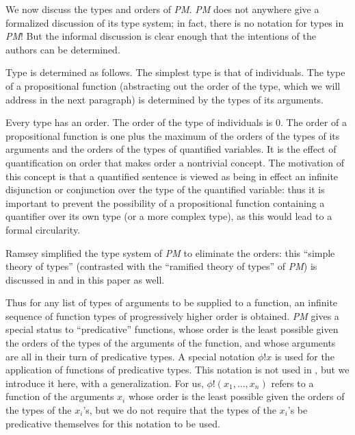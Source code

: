 \documentclass{article}
\begin{document}
We now discuss the types and orders of {\em PM\/}.  {\em PM\/} does
not anywhere give a formalized discussion of its type system; in fact,
there is no notation for types in {\em PM\/}!  But the informal
discussion is clear enough that the intentions of the authors can be
determined.

Type is determined as follows.  The simplest type is that of
individuals.  The type of a propositional function (abstracting out
the order of the type, which we will address in the next paragraph) is
determined by the types of its arguments.

Every type has an order.  The order of the type of individuals is 0.
The order of a propositional function is one plus the maximum of the
orders of the types of its arguments and the orders of the types of
quantified variables.  It is the effect of quantification on order
that makes order a nontrivial concept.  The motivation of this concept
is that a quantified sentence is viewed as being in effect an infinite
disjunction or conjunction over the type of the quantified variable:
thus it is important to prevent the possibility of a propositional
function containing a quantifier over its own type (or a more complex
type), as this would lead to a formal circularity.

Ramsey simplified the type system of {\em PM\/} to eliminate the
orders: this ``simple theory of types'' (contrasted with the
``ramified theory of types'' of {\em PM\/}) is discussed in
\cite{types40} and in this paper as well.

Thus for any list of types of arguments to be supplied to a function,
an infinite sequence of function types of progressively higher order
is obtained.  {\em PM\/} gives a special status to ``predicative''
functions, whose order is the least possible given the orders of the
types of the arguments of the function, and whose arguments are all in
their turn of predicative types.  A special notation $\phi! x$ is used
for the application of functions of predicative types.  This notation
is not used in \cite{types40}, but we introduce it here, with a
generalization.  For us, $\phi!(x_1,\ldots,x_n)$ refers to a function
of the arguments $x_i$ whose order is the least possible given the
orders of the types of the $x_i$'s, but we do not require that the
types of the $x_i$'s be predicative themselves for this notation to be
used.
\end{document}
